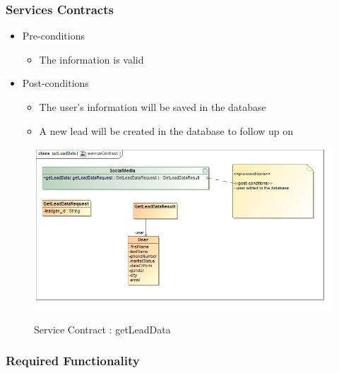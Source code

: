 \documentclass{article}
\begin{document}
		\subsubsection{Services Contracts}
		\begin{itemize}
			\item Pre-conditions
				\begin{itemize}
					\item The information is valid
				\end{itemize}
			\item Post-conditions
				\begin{itemize}
					\item The user's information will be saved in the database
					\item A new lead will be created in the database to follow up on
				\end{itemize}
		\end{itemize}
		\begin{figure}[H]
		\includegraphics[width=\textwidth]{images/class__getLeadData__serviceContract.jpg}  \\
		\caption{Service Contract : getLeadData}
		\end{figure}

		\subsubsection{Required Functionality}
\end{document}

